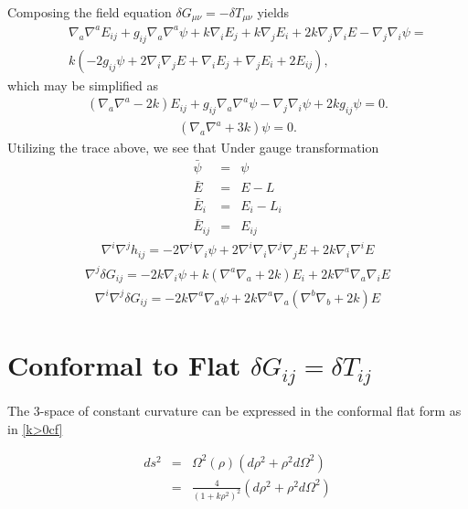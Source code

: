 \documentclass[10pt,letterpaper]{article}
\numberwithin{equation}{section}
\begin{document}
Composing the field equation $\delta G_{\mu\nu} =-\delta T_{\mu\nu}$ yields
\begin{eqnarray}
&&\nabla_{a}\nabla^{a}E_{ij}
 +g_{ij} \nabla_{a}\nabla^{a}\psi
 + k \nabla_{i}E_{j}
 + k \nabla_{j}E_{i}
 + 2 k \nabla_{j}\nabla_{i}E
 -  \nabla_{j}\nabla_{i}\psi =
\nonumber \\
&& k (-2 g_{ij}\psi + 2\nabla_i\nabla_j E + \nabla_i E_j + \nabla_j E_i + 2E_{ij}),
\end{eqnarray}
which may be simplified as
\begin{eqnarray}
\boxed{
(\nabla_a \nabla^a-2k)E_{ij} + g_{ij}\nabla_a \nabla^a \psi - \nabla_j\nabla_i \psi+2k g_{ij}\psi = 0}.
\label{eqref1}
\end{eqnarray}
\begin{eqnarray}
\boxed{
(\nabla_a \nabla^a + 3k)\psi = 0}.
\end{eqnarray}
Utilizing the trace above, we see that 
Under gauge transformation 
\begin{eqnarray}
\bar\psi &=&\psi
\nonumber\\
\bar E &=& E-L
\nonumber\\
\bar E_i &=& E_i - L_i
\nonumber\\
\bar E_{ij} &=& E_{ij}
\end{eqnarray}
\begin{eqnarray}
\nabla^i \nabla^j h_{ij} = -2\nabla^i \nabla_i \psi + 2\nabla^i\nabla_i \nabla^j\nabla_j E + 2k \nabla_i \nabla^i E
\end{eqnarray}
\begin{eqnarray}
\nabla^j \delta G_{ij} =  -2k\nabla_i \psi + k(\nabla^a\nabla_a + 2k)E_i + 2k \nabla^a\nabla_a \nabla_i E 
\end{eqnarray}
\begin{eqnarray}
\nabla^i \nabla^j \delta G_{ij} = -2k\nabla^a \nabla_a \psi + 2k \nabla^a\nabla_a(\nabla^b \nabla_b + 2k)E
\end{eqnarray}


\section{Conformal to Flat $\delta G_{ij} = \delta T_{ij}$}
The 3-space of constant curvature can be expressed in the conformal flat form as in \eqref{k>0cf}

\begin{eqnarray}
ds^2 &=& \Omega^2(\rho)\left( d\rho^2 + \rho^2 d\Omega^2\right)
\nonumber\\
&=& \frac{4}{\left(1+k \rho^2\right)^2}\left( d\rho^2 + \rho^2 d\Omega^2\right)
\label{cfbg}
\end{eqnarray}
\end{document}
